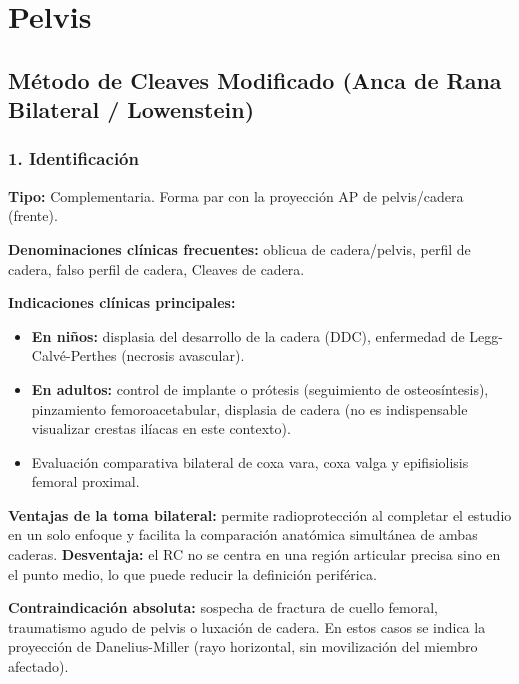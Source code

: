 	
	\section{Pelvis}
	
	\subsection{Método de Cleaves Modificado (Anca de Rana Bilateral / Lowenstein)}
	
	\subsubsection*{1. Identificación}
	
	\textbf{Tipo:} Complementaria. Forma par con la proyección AP de pelvis/cadera (frente).
	
	\textbf{Denominaciones clínicas frecuentes:} oblicua de cadera/pelvis, perfil de cadera, falso perfil de cadera, Cleaves de cadera.
	
	\textbf{Indicaciones clínicas principales:}
	\begin{itemize}
		\item \textbf{En niños:} displasia del desarrollo de la cadera (DDC), enfermedad de Legg-Calvé-Perthes (necrosis avascular).
		\item \textbf{En adultos:} control de implante o prótesis (seguimiento de osteosíntesis), pinzamiento femoroacetabular, displasia de cadera (no es indispensable visualizar crestas ilíacas en este contexto).
		\item Evaluación comparativa bilateral de coxa vara, coxa valga y epifisiolisis femoral proximal.
	\end{itemize}
	
	\textbf{Ventajas de la toma bilateral:} permite radioprotección al completar el estudio en un solo enfoque y facilita la comparación anatómica simultánea de ambas caderas. \textbf{Desventaja:} el RC no se centra en una región articular precisa sino en el punto medio, lo que puede reducir la definición periférica.
	
	\textbf{Contraindicación absoluta:} sospecha de fractura de cuello femoral, traumatismo agudo de pelvis o luxación de cadera. En estos casos se indica la proyección de Danelius-Miller (rayo horizontal, sin movilización del miembro afectado).
	
